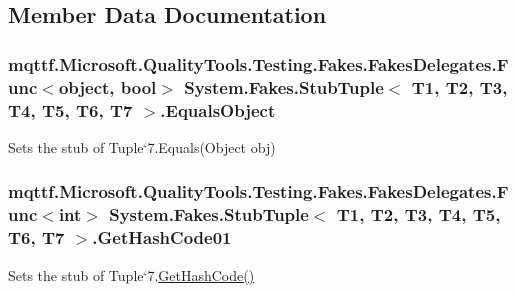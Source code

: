 \subsection{Member Data Documentation}
\hypertarget{class_system_1_1_fakes_1_1_stub_tuple_3_01_t1_00_01_t2_00_01_t3_00_01_t4_00_01_t5_00_01_t6_00_01_t7_01_4_a64109d1cde3c75824b2dfe8d7bcace42}{
\subsubsection[{Equals\-Object}]{\setlength{\rightskip}{0pt plus 5cm}mqttf.\-Microsoft.\-Quality\-Tools.\-Testing.\-Fakes.\-Fakes\-Delegates.\-Func$<$object, bool$>$ System.\-Fakes.\-Stub\-Tuple$<$ T1, T2, T3, T4, T5, T6, T7 $>$.Equals\-Object}}\label{class_system_1_1_fakes_1_1_stub_tuple_3_01_t1_00_01_t2_00_01_t3_00_01_t4_00_01_t5_00_01_t6_00_01_t7_01_4_a64109d1cde3c75824b2dfe8d7bcace42}


Sets the stub of Tuple`7.Equals(\-Object obj)

\hypertarget{class_system_1_1_fakes_1_1_stub_tuple_3_01_t1_00_01_t2_00_01_t3_00_01_t4_00_01_t5_00_01_t6_00_01_t7_01_4_a65fb7dfc36b7ea9c59850830233172a6}{
\subsubsection[{Get\-Hash\-Code01}]{\setlength{\rightskip}{0pt plus 5cm}mqttf.\-Microsoft.\-Quality\-Tools.\-Testing.\-Fakes.\-Fakes\-Delegates.\-Func$<$int$>$ System.\-Fakes.\-Stub\-Tuple$<$ T1, T2, T3, T4, T5, T6, T7 $>$.Get\-Hash\-Code01}}\label{class_system_1_1_fakes_1_1_stub_tuple_3_01_t1_00_01_t2_00_01_t3_00_01_t4_00_01_t5_00_01_t6_00_01_t7_01_4_a65fb7dfc36b7ea9c59850830233172a6}


Sets the stub of Tuple`7.\hyperlink{class_system_1_1_fakes_1_1_stub_tuple_3_01_t1_00_01_t2_00_01_t3_00_01_t4_00_01_t5_00_01_t6_00_01_t7_01_4_ac862abf0f649471d158b3beb00cfe7d1}{Get\-Hash\-Code()}

